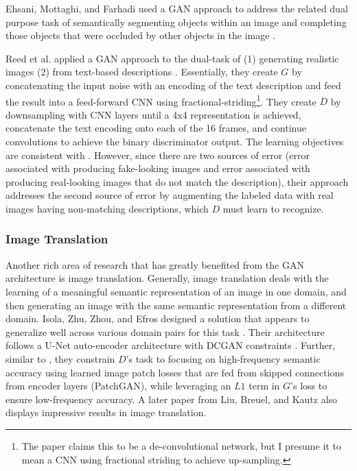 \documentclass[11pt]{article}
\begin{document}
Ehsani, Mottaghi, and Farhadi used a GAN approach to address the related dual purpose task of semantically segmenting objects within an image and completing those objects that were occluded by other objects in the image \cite{ehsani2017segan}.

Reed et al. applied a GAN approach to the dual-task of (1) generating realistic images (2) from text-based descriptions \cite{reed2016generative}.  Essentially, they create $G$ by concatenating the input noise with an encoding of the text description and feed the result into a feed-forward CNN using fractional-striding\footnote{The paper claims this to be a de-convolutional network, but I presume it to mean a CNN using fractional striding to achieve up-sampling.}.  They create $D$ by downsampling with CNN layers until a 4x4 representation is achieved, concatenate the text encoding onto each of the 16 frames, and continue convolutions to achieve the binary discriminator output.  The learning objectives are consistent with \cite{NIPS2014_5423}.  However, since there are two sources of error (error associated with producing fake-looking images and error associated with producing real-looking images that do not match the description), their approach addresses the second source of error by augmenting the labeled data with real images having non-matching descriptions, which $D$ must learn to recognize.

\subsubsection{Image Translation}

Another rich area of research that has greatly benefited from the GAN architecture is image translation.  Generally, image translation deals with the learning of a meaningful semantic representation of an image in one domain, and then generating an image with the same semantic representation from a different domain.  Isola, Zhu, Zhou, and Efros designed a solution that appears to generalize well across various domain pairs for this task \cite{isola2017image}.  Their architecture follows a U-Net auto-encoder architecture \cite{ronneberger2015u} with DCGAN constraints \cite{salimans2016improved}.  Further, similar to \cite{pathakCVPR16context}, they constrain $D$'s task to focusing on high-frequency semantic accuracy using learned image patch losses that are fed from skipped connections from encoder layers (PatchGAN), while leveraging an $L1$ term in $G$'s loss to ensure low-frequency accuracy.  A later paper from Liu, Breuel, and Kautz also displays impressive results \cite{NIPS2017_6672} in image translation.
\end{document}
